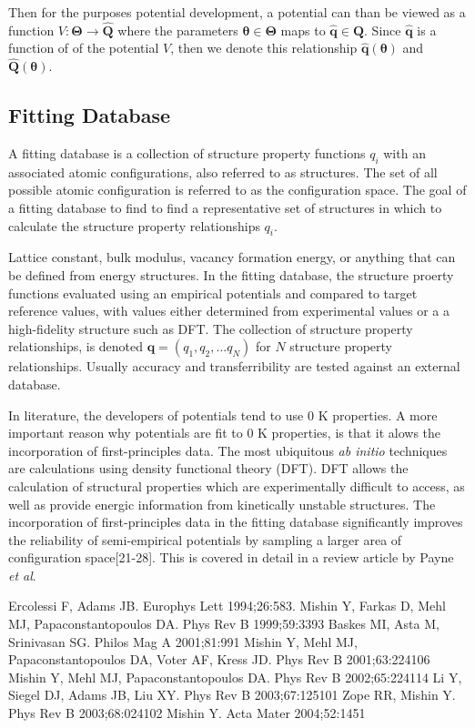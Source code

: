 Then for the purposes potential development, a potential can than be viewed as a function $V:\bm{\Theta} \rightarrow \hat{\bm{Q}}$ where the parameters $\bm{\theta} \in \bm{\Theta}$ maps to $\hat{\bm{q}} \in \hat{\bm{Q}}$.
Since $\hat{\bm{q}}$ is a function of of the potential $V$, then we denote this relationship
$\hat{\bm{q}}(\bm{\theta})$ and
$\hat{\bm{Q}}(\bm{\theta})$.

\subsection{Fitting Database}
A fitting database is a collection of structure property functions $q_i$ with an associated atomic configurations, also referred to as structures.
The set of all possible atomic configuration is referred to as the configuration space.
The goal of a fitting database to find to find a representative set of structures in which to calculate the structure property relationships $q_i$.

Lattice constant, bulk modulus, vacancy formation energy, or anything that can be defined from energy structures.  In the fitting database, the structure proerty functions evaluated using an empirical potentials and compared to target reference values, with values either determined from experimental values or a a high-fidelity structure such as DFT.  The collection of structure property relationships, is denoted $\bm{q}=(q_1,q_2,...q_N)$ for $N$ structure property relationships.  Usually accuracy and transferribility are tested against an external database.

In literature, the developers of potentials tend to use $0$ K properties.  A more important reason why potentials are fit to $0$ K properties, is that it alows the incorporation of first-principles data.
The most ubiquitous \emph{ab initio} techniques are calculations using density functional theory (DFT).
DFT allows the calculation of structural properties which are experimentally difficult to access, as well as provide energic information from kinetically unstable structures.
The incorporation of first-principles data in the fitting database significantly improves the reliability of semi-empirical potentials by sampling a larger area of configuration space[21-28].
This is covered in detail in a review article by Payne \emph{et al}\cite{payne1996_dft_database}.


Ercolessi F, Adams JB. Europhys Lett 1994;26:583.
Mishin Y, Farkas D, Mehl MJ, Papaconstantopoulos DA. Phys Rev B 1999;59:3393
Baskes MI, Asta M, Srinivasan SG. Philos Mag A 2001;81:991
Mishin Y, Mehl MJ, Papaconstantopoulos DA, Voter AF, Kress JD. Phys Rev B 2001;63:224106
Mishin Y, Mehl MJ, Papaconstantopoulos DA. Phys Rev B 2002;65:224114
Li Y, Siegel DJ, Adams JB, Liu XY. Phys Rev B 2003;67:125101
Zope RR, Mishin Y. Phys Rev B 2003;68:024102
Mishin Y. Acta Mater 2004;52:1451

